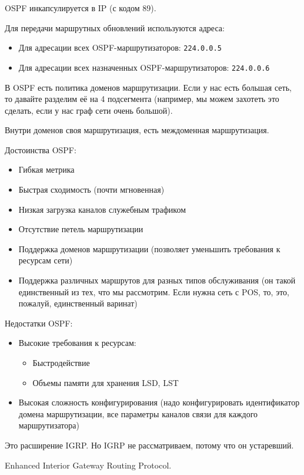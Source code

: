OSPF инкапсулируется в IP (с кодом 89).

Для передачи маршрутных обновлений используются адреса:
\begin{itemize}
    \item Для адресации всех OSPF-маршрутизаторов: {\tt 224.0.0.5}
    \item Для адресации всех назначенных OSPF-маршрутизаторов: {\tt 224.0.0.6}
\end{itemize}

В OSPF есть политика доменов маршрутизации. Если у нас есть большая сеть, то давайте разделим её на 4 подсегмента (например, мы можем захотеть это сделать, если у нас граф сети очень большой).

Внутри доменов своя маршрутизация, есть междоменная маршрутизация. 

Достоинства OSPF:
\begin{itemize}
    \item Гибкая метрика
    \item Быстрая сходимость (почти мгновенная)
    \item Низкая загрузка каналов служебным трафиком
    \item Отсутствие петель маршрутизации
    \item Поддержка доменов маршрутизации (позволяет уменьшить требования к ресурсам сети)
    \item Поддержка различных маршрутов для разных типов обслуживания (он такой единственный из тех, что мы рассмотрим. Если нужна сеть с POS, то, это, пожалуй, единственный варинат)
\end{itemize}
Недостатки OSPF:
\begin{itemize}
    \item Высокие требования к ресурсам:
    \begin{itemize}
        \item Быстродействие
        \item Объемы памяти для хранения LSD, LST
    \end{itemize}
    \item Высокая сложность конфигурирования (надо конфигурировать идентификатор домена маршрутизации, все параметры каналов связи для каждого маршрутизатора)
\end{itemize}


Это расширение IGRP. Но IGRP не рассматриваем, потому что он устаревший.

Enhanced Interior Gateway Routing Protocol.

